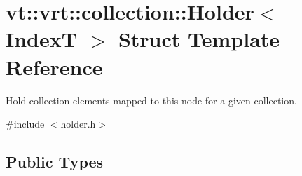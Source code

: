 \hypertarget{structvt_1_1vrt_1_1collection_1_1_holder}{}\section{vt\+:\+:vrt\+:\+:collection\+:\+:Holder$<$ IndexT $>$ Struct Template Reference}
\label{structvt_1_1vrt_1_1collection_1_1_holder}


Hold collection elements mapped to this node for a given collection.  




{\ttfamily \#include $<$holder.\+h$>$}

\subsection*{Public Types}

